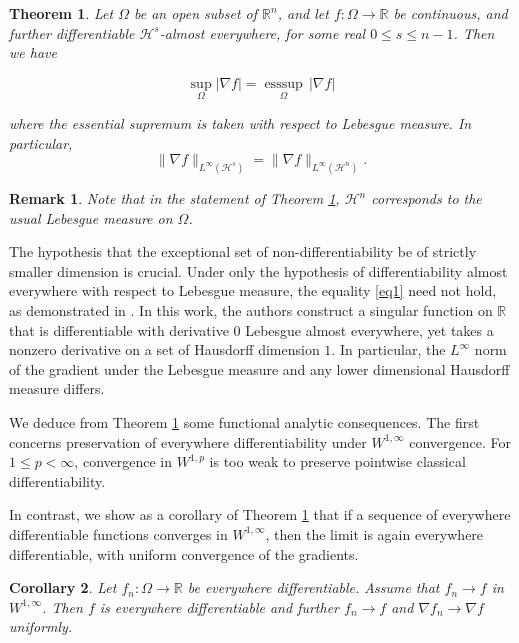 \documentclass{article}
\newtheorem{theorem}{Theorem}
\newtheorem{corollary}[theorem]{Corollary}
\newtheorem*{remark}{Remark}
\DeclareMathOperator{\esssup}{esssup}
\begin{document}
\begin{theorem}\label{maintheorem}
Let $\Omega$ be an open subset of $\mathbb R^n$, and let $f: \Omega \to \mathbb R$ be continuous, and further differentiable $\mathcal H^s$-almost everywhere, for some real $0 \leq s \leq n-1$. Then we have

\begin{equation}\label{eq1}\sup_{\Omega} |\nabla f| = \underset{\Omega}{\esssup} \, |\nabla f|\end{equation}

\noindent where the essential supremum is taken with respect to Lebesgue measure. In particular,
\begin{equation}\label{eq2}\|\nabla f\|_{L^\infty (\mathcal H^s)} = \|\nabla f\|_{L^\infty(\mathcal H^n)}.\end{equation}
\end{theorem}
\begin{remark}Note that in the statement of Theorem \ref{maintheorem}, $\mathcal H^n$ corresponds to the usual Lebesgue measure on $\Omega$.\end{remark}

 The hypothesis that the exceptional set of non-differentiability be of strictly smaller dimension is crucial. Under only the hypothesis of differentiability almost everywhere with respect to Lebesgue measure, the equality \ref{eq1} need not hold, as demonstrated in \cite{FERNANDEZSANCHEZ2016713}. In this work, the authors construct a singular function on $\mathbb R$ that is differentiable with derivative $0$ Lebesgue almost everywhere, yet takes a nonzero derivative on a set of Hausdorff dimension $1$. In particular, the $L^\infty$ norm of the gradient under the Lebesgue measure and any lower dimensional Hausdorff measure differs.

We deduce from Theorem \ref{maintheorem} some functional analytic consequences. The first concerns preservation of everywhere differentiability under $W^{1, \infty}$ convergence. For $1 \leq p < \infty$, convergence in $W^{1, p}$ is too weak to preserve pointwise classical differentiability.

In contrast, we show as a corollary of Theorem \ref{maintheorem} that if a sequence of everywhere differentiable functions converges in $W^{1, \infty}$, then the limit is again everywhere differentiable, with uniform convergence of the gradients.

\begin{corollary}\label{corollary2}
Let $f_n: \Omega \to \mathbb R$ be everywhere differentiable. Assume that $f_n \to f$ in $W^{1, \infty}$. Then $f$ is everywhere differentiable and further $f_n \to f$ and $\nabla f_n \to \nabla f$ uniformly.
\end{corollary}
\end{document}
